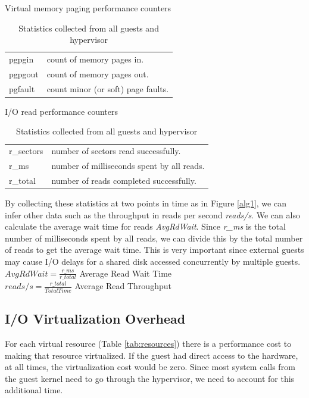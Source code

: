 \begin{table}[h]
\begin{subtable}[h]{0.45\textwidth}
\caption{Virtual memory paging performance counters \cite{memory}}
\begin{tabular}{ l l }
       pgpgin  &  count of memory pages in. \\
       pgpgout  & count of memory pages out. \\
       pgfault  & count minor (or soft) page faults. \\
\end{tabular}
\label{fig:memory}
\end{subtable}
\hfill
\begin{subtable}[h]{0.45\textwidth}
\caption{I/O read performance counters \cite{iostats}}
\begin{tabular}{ l l }
       r\_sectors & number of sectors read successfully. \\
       r\_ms & number of milliseconds spent by all reads. \\
       r\_total & number of reads completed successfully. \\
\end{tabular}
\label{fig:io}
\end{subtable}
\caption{Statistics collected from all guests and hypervisor}
\end{table}

By collecting these statistics at two points in time as in Figure \ref{alg1}, we can infer other data such as the throughput in reads per second \emph{reads/s}.  We can also calculate the average wait time for reads \emph{AvgRdWait}.  
Since \emph{r\_ms} is the total number of milliseconds spent by all reads, we can divide this by the total number of reads to get the average wait time.  This is very important since external guests may cause I/O delays for a shared disk accessed concurrently by multiple guests.
\newline\newline
\Large
	$AvgRdWait = \frac{r\_ms}{r\_total}$   Average Read Wait Time\\
	$reads/s = \frac{r\_total}{TotalTime}$  Average Read Throughput \\
\normalsize

\subsection{I/O Virtualization Overhead}
For each virtual resource (Table \ref{tab:resources}) there is a performance cost to making that resource virtualized.  If the guest had direct access to the hardware, at all times, the virtualization cost would be zero.  Since most system calls from the guest kernel need to go through the hypervisor, we need to account for this additional time.

